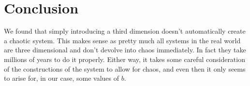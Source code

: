\documentclass[12pt]{article}
\numberwithin{equation}{section}
\numberwithin{figure}{section}
\numberwithin{table}{section}
\begin{document}
    \section{Conclusion}\label{sec:Conclusion}
    We found that simply introducing a third dimension doesn't automatically create a chaotic 
    system. This makes sense as pretty much all systems in the real world are three dimensional 
    and don't devolve into chaos immediately. In fact they take millions of years to do it 
    properly. Either way, it takes some careful consideration of the constructions of the system 
    to allow for chaos, and even then it only seems to arise for, in our case, some values of $b$. 
\end{document}
